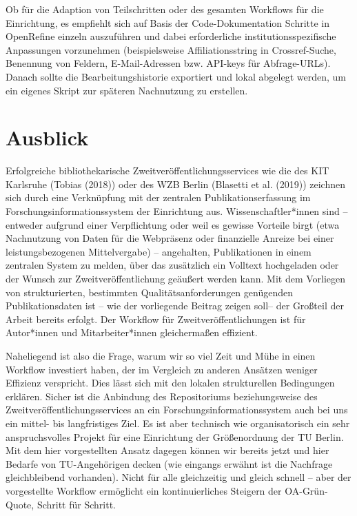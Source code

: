 \documentclass[a4paper,
fontsize=11pt,
oneside,
numbers=noperiodatend,
parskip=half-,
bibliography=totoc,
final
]{scrartcl}
\begin{document}
Ob für die Adaption von Teilschritten oder des gesamten Workflows für
die Einrichtung, es empfiehlt sich auf Basis der Code-Dokumentation
Schritte in OpenRefine einzeln auszuführen und dabei erforderliche
institutionsspezifische Anpassungen vorzunehmen (beispielsweise
Affiliationsstring in Crossref-Suche, Benennung von Feldern,
E-Mail-Adressen bzw. API-keys für Abfrage-URLs). Danach sollte die
Bearbeitungshistorie exportiert und lokal abgelegt werden, um ein
eigenes Skript zur späteren Nachnutzung zu erstellen.

\hypertarget{ausblick}{%
\section*{Ausblick}\label{ausblick}}

Erfolgreiche bibliothekarische Zweitveröffentlichungsservices wie die
des KIT Karlsruhe (Tobias (2018)) oder des WZB Berlin (Blasetti et al.
(2019)) zeichnen sich durch eine Verknüpfung mit der zentralen
Publikationserfassung im Forschungsinformationssystem der Einrichtung
aus. Wissenschaftler*innen sind -- entweder aufgrund einer Verpflichtung
oder weil es gewisse Vorteile birgt (etwa Nachnutzung von Daten für die
Webpräsenz oder finanzielle Anreize bei einer leistungsbezogenen
Mittelvergabe) -- angehalten, Publikationen in einem zentralen System zu
melden, über das zusätzlich ein Volltext hochgeladen oder der Wunsch zur
Zweitveröffentlichung geäußert werden kann. Mit dem Vorliegen von
strukturierten, bestimmten Qualitätsanforderungen genügenden
Publikationsdaten ist -- wie der vorliegende Beitrag zeigen soll-- der
Großteil der Arbeit bereits erfolgt. Der Workflow für
Zweitveröffentlichungen ist für Autor*innen und Mitarbeiter*innen
gleichermaßen effizient.

Naheliegend ist also die Frage, warum wir so viel Zeit und Mühe in einen
Workflow investiert haben, der im Vergleich zu anderen Ansätzen weniger
Effizienz verspricht. Dies lässt sich mit den lokalen strukturellen
Bedingungen erklären. Sicher ist die Anbindung des Repositoriums
beziehungsweise des Zweitveröffentlichungsservices an ein
Forschungsinformationssystem auch bei uns ein mittel- bis langfristiges
Ziel. Es ist aber technisch wie organisatorisch ein sehr anspruchsvolles
Projekt für eine Einrichtung der Größenordnung der TU Berlin. Mit dem
hier vorgestellten Ansatz dagegen können wir bereits jetzt und hier
Bedarfe von TU-Angehöri\-gen decken (wie eingangs erwähnt ist die
Nachfrage gleichbleibend vorhanden). Nicht für alle gleichzeitig und
gleich schnell -- aber der vorgestellte Workflow ermöglicht ein
kontinuierliches Steigern der OA-Grün-Quote, Schritt für Schritt.
\end{document}
